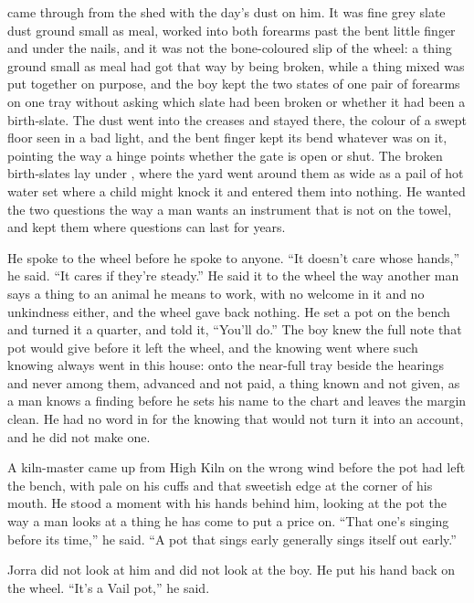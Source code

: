 \scenebreak

 came through from the shed with the day's dust on him. It was fine grey slate dust ground small as meal, worked into both forearms past the bent little finger and under the nails, and it was not the bone-coloured slip of the wheel: a thing ground small as meal had got that way by being broken, while a thing mixed was put together on purpose, and the boy kept the two states of one pair of forearms on one tray without asking which slate had been broken or whether it had been a birth-slate. The dust went into the creases and stayed there, the colour of a swept floor seen in a bad light, and the bent finger kept its bend whatever was on it, pointing the way a hinge points whether the gate is open or shut. The broken birth-slates lay under , where the yard went around them as wide as a pail of hot water set where a child might knock it and entered them into nothing. He wanted the two questions the way a man wants an instrument that is not on the towel, and kept them where questions can last for years.

He spoke to the wheel before he spoke to anyone. “It doesn't care whose hands,” he said. “It cares if they're steady.” He said it to the wheel the way another man says a thing to an animal he means to work, with no welcome in it and no unkindness either, and the wheel gave back nothing. He set a pot on the bench and turned it a quarter, and told it, “You'll do.” The boy knew the full note that pot would give before it left the wheel, and the knowing went where such knowing always went in this house: onto the near-full tray beside the hearings and never among them, advanced and not paid, a thing known and not given, as a man knows a finding before he sets his name to the chart and leaves the margin clean. He had no word in  for the knowing that would not turn it into an account, and he did not make one.

\scenebreak

A kiln-master came up from High Kiln on the wrong wind before the pot had left the bench, with  pale on his cuffs and that sweetish edge at the corner of his mouth. He stood a moment with his hands behind him, looking at the pot the way a man looks at a thing he has come to put a price on. “That one's singing before its time,” he said. “A pot that sings early generally sings itself out early.”

Jorra did not look at him and did not look at the boy. He put his hand back on the wheel. “It's a Vail pot,” he said.

